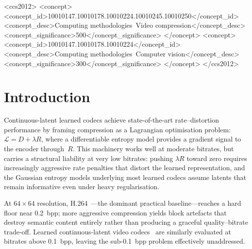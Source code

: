 \documentclass[sigconf, screen, review, anonymous]{acmart}
\begin{document}
\begin{CCSXML}
<ccs2012>
  <concept>
    <concept_id>10010147.10010178.10010224.10010245.10010250</concept_id>
    <concept_desc>Computing methodologies~Video compression</concept_desc>
    <concept_significance>500</concept_significance>
  </concept>
  <concept>
    <concept_id>10010147.10010178.10010224</concept_id>
    <concept_desc>Computing methodologies~Computer vision</concept_desc>
    <concept_significance>300</concept_significance>
  </concept>
</ccs2012>
\end{CCSXML}



\maketitle

\section{Introduction}
\label{sec:intro}

Continuous-latent learned codecs achieve state-of-the-art
rate--distortion performance by framing compression as a Lagrangian
optimisation problem: $\mathcal{L} = D + \lambda R$, where a
differentiable entropy model provides a gradient signal to the encoder
through~$R$. This machinery works well at moderate bitrates, but
carries a structural liability at very low bitrates: pushing $\lambda R$
toward zero requires increasingly aggressive rate penalties that distort
the learned representation, and the Gaussian entropy models underlying
most learned codecs assume latents that remain informative even under
heavy regularisation.

At $64\!\times\!64$ resolution, H.264~\cite{wiegand2003h264}---the dominant practical
baseline---reaches a hard floor near 0.2~bpp; more aggressive
compression yields block artefacts that destroy semantic content
entirely rather than producing a graceful quality--bitrate trade-off.
Learned continuous-latent video codecs~\cite{lu2019dvc,li2021dcvc}
are similarly evaluated at bitrates above 0.1~bpp, leaving the
sub-0.1~bpp problem effectively unaddressed.
\end{document}
